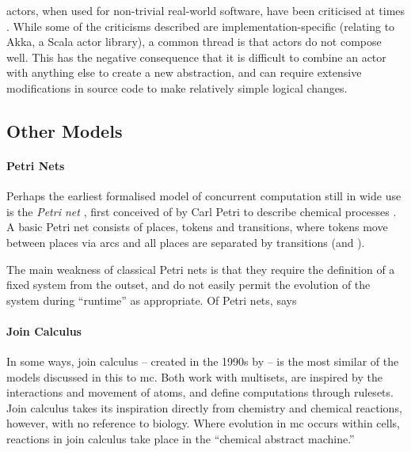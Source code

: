 \Glspl{actor}, when used for non-trivial real-world software, have been criticised at times \eg{} \cite{Welsh2013,Stucchio2013}.  While some of the criticisms described are implementation-specific (relating to Akka, a Scala \gls{actor} library), a common thread is that \glspl{actor} do not compose well.  This has the negative consequence that it is difficult to combine an \gls{actor} with anything else to create a new abstraction, and can require extensive modifications in source code to make relatively simple logical changes.

\subsection{\label{sec:back:othermodels}Other Models}

\paragraph{Petri Nets}
Perhaps the earliest formalised model of concurrent computation still in wide use is the \emph{Petri net} \cite{Dennis2011}, first conceived of by Carl Petri to describe chemical processes \cite{Petri2008}.  A basic Petri net consists of places, tokens and transitions, where tokens move between places via arcs and all places are separated by transitions (and \viceversa).

The main weakness of classical Petri nets is that they require the definition of a fixed system from the outset, and do not easily permit the evolution of the system during ``runtime'' as appropriate.  Of Petri nets, \citeauthor{Varela2013} says 

\paragraph{Join Calculus}
In some ways, join calculus -- created in the 1990s by \citeauthor{Fournet1996} \cite{Fournet1996,Fournet2002} -- is the most similar of the models discussed in this  to \gls{mc}.  Both work with multisets, are inspired by the interactions and movement of atoms, and define computations through rulesets.  Join calculus takes its inspiration directly from chemistry and chemical reactions, however, with no reference to biology.  Where evolution in \gls{mc} occurs within cells, reactions in join calculus take place in the ``chemical abstract machine.''


